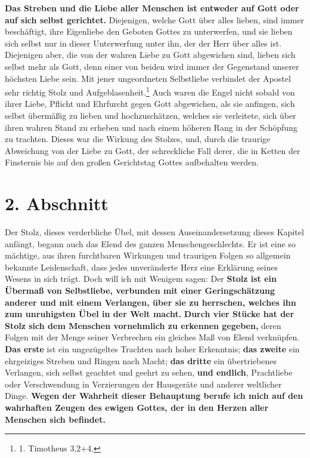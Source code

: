 \textbf{Das Streben und die Liebe aller Menschen ist
entweder auf Gott oder auf sich
selbst gerichtet.} Diejenigen, welche Gott über alles lieben, sind immer
beschäftigt, ihre Eigenliebe den Geboten Gottes zu unterwerfen, und sie lieben
sich selbst nur in dieser Unterwerfung unter ihn, der der Herr über alles ist.
Diejenigen aber, die von der wahren Liebe zu Gott abgewichen sind, lieben sich
selbst mehr als Gott, denn einer von beiden wird immer der Gegenstand unserer
höchsten Liebe sein. Mit jener ungeordneten Selbstliebe verbindet der Apostel
sehr richtig Stolz und Aufgeblasenheit.\footnote{1.
Timotheus 3,2+4.}
Auch waren die
Engel nicht sobald von ihrer Liebe,
Pflicht und Ehrfurcht gegen Gott abgewichen,
als sie anfingen, sich selbst übermäßig zu lieben und hochzuschätzen, welches
sie verleitete, sich über ihren wahren Stand zu erheben und nach einem höheren
Rang in der Schöpfung zu trachten. Dieses war die Wirkung
des Stolzes, und,
durch die traurige Abweichung von der Liebe zu Gott, der schreckliche Fall
derer, die in Ketten der Finsternis bis auf den großen Gerichtstag
Gottes
aufbehalten werden.

\section{2. Abschnitt} \label{kap7_ab2}

Der Stolz, dieses verderbliche Übel, mit dessen Auseinandersetzung
dieses
Kapitel anfängt, begann auch das Elend des ganzen Menschengeschlechts. Er ist
eine so mächtige, aus ihren furchtbaren Wirkungen und traurigen Folgen so
allgemein bekannte Leidenschaft, dass jedes unveränderte Herz eine Erklärung
seines Wesens in sich trägt. Doch will ich mit Wenigem sagen: Der \textbf{Stolz
ist ein Übermaß von Selbstliebe, verbunden mit einer Geringschätzung
anderer und mit einem Verlangen, über sie zu
herrschen, welches ihn zum unruhigsten Übel in der
Welt macht.} \textbf{Durch vier Stücke hat der Stolz sich dem Menschen
vornehmlich zu
erkennen gegeben,} deren Folgen mit der Menge seiner Verbrechen ein gleiches Maß
von Elend verknüpfen. \textbf{Das erste} ist ein ungezügeltes Trachten nach
hoher
Erkenntnis; \textbf{das zweite} ein ehrgeiziges Streben und
Ringen nach Macht; \textbf{das dritte} ein übertriebenes Verlangen,
sich selbst geachtet und geehrt zu sehen,
\textbf{und endlich}, Prachtliebe oder Verschwendung in
Verzierungen der Hausgeräte und anderer weltlicher Dinge. \textbf{Wegen der
Wahrheit dieser Behauptung berufe ich mich auf den wahrhaften Zeugen des ewigen
Gottes, der in den Herzen aller Menschen
sich befindet.}

